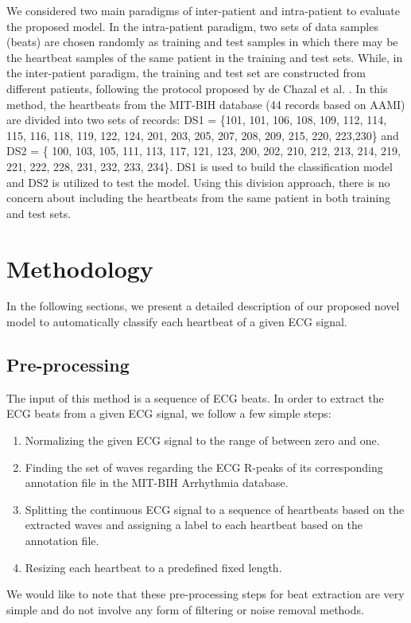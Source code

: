 \documentclass{article}
\begin{document}
We considered two main paradigms of inter-patient and intra-patient to evaluate the proposed model. In the intra-patient paradigm, two sets of data samples (beats) are chosen randomly as training and test samples in which there may be the heartbeat samples of the same patient in the training and test sets. While, in the inter-patient paradigm, the training and test set are constructed from different patients, following the protocol proposed by de Chazal et al. \cite{de2004automatic}. In this method, the heartbeats from the MIT-BIH database (44 records based on AAMI) are divided into two sets of records: DS1 = \{101, 101, 106, 108, 109, 112, 114, 115, 116, 118, 119, 122, 124, 201, 203, 205, 207, 208, 209, 215, 220, 223,230\} and DS2 = \{ 100, 103, 105, 111, 113, 117, 121, 123, 200, 202, 210, 212, 213, 214, 219, 221, 222, 228, 231, 232, 233, 234\}. DS1 is used to build the classification model and DS2 is utilized to test the model. Using this division approach, there is no concern about including the heartbeats from the same patient in both training and test sets.

\section{Methodology}
\label{sec:propsed}
In the following sections, we present a detailed description of our proposed novel model to automatically classify each heartbeat of a given ECG signal. 

\subsection{Pre-processing}
The input of this method is a sequence of ECG beats. In order to extract the ECG beats from a given ECG signal, we follow a few simple steps:

\begin{enumerate}
	\item Normalizing the given ECG signal to the range of between
zero and one. 
	\item Finding the set of  waves regarding the ECG R-peaks of its corresponding annotation file in the MIT-BIH Arrhythmia database.
	\item Splitting the continuous ECG signal to a sequence of heartbeats based on the extracted  waves and assigning a label to each heartbeat based on the annotation file. 
	\item Resizing each heartbeat to a predefined fixed length.
\end{enumerate}
 We would like to note that these pre-processing steps for beat extraction are very simple and do not involve any form of filtering or noise removal methods.   
\end{document}
